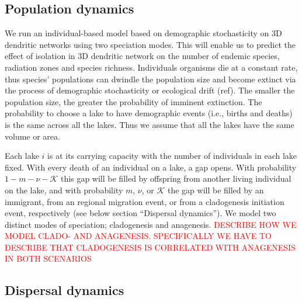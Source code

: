 \documentclass[11pt]{article}
\newcommand{\carlos}[1]{\textcolor{Red}{#1}}
\begin{document}
{\subsection{Population dynamics}

We run an individual-based model based on demographic stochasticity on
3D dendritic networks using two speciation modes. This will enable us
to predict the effect of isolation in 3D dendritic network on the
number of endemic species, radiation zones and species richness. Individuals organisms die at a constant rate, thus species'
populations can dwindle the population size and become extinct via the
process of demographic stochasticity or ecological drift (ref). The
smaller the population size, the greater the probability of imminent
extinction. The probability to choose a lake to have demographic
events (i.e., births and deaths) is the same across all the
lakes. Thus we assume that all the lakes have the same volume or area.


Each lake $i$ is at its carrying capacity with the number of
individuals in each lake fixed. With every death of an individual on a
lake, a gap opens. With probability $1 - m - \nu - \mathcal{K}$ this
gap will be filled by offspring from another living individual on the
lake, and with probability $m$, $\nu$, or $\mathcal{K}$ the gap will
be filled by an immigrant, from an regional migration event, or from a
cladogenesis initiation event, respectively (see below section
``Dispersal dynamics''). We model two distinct modes of speciation;
cladogenesis and anagenesis. \carlos{DESCRIBE HOW WE MODEL CLADO-
  AND ANAGENESIS. SPECIFICALLY WE HAVE TO DESCRIBE THAT CLADOGENESIS IS CORRELATED WITH ANAGENESIS IN BOTH SCENARIOS}

\subsection{Dispersal dynamics}

}
\end{document}
